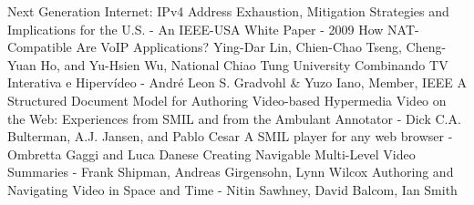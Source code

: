 \documentclass[11pt,twocolumn]{article}
\begin{document}
\begin{thebibliography}{9}


 Next Generation Internet: IPv4 Address Exhaustion, Mitigation Strategies and Implications for the U.S. - An IEEE-USA White Paper - 2009
 How NAT-Compatible Are VoIP Applications? Ying-Dar Lin, Chien-Chao Tseng, Cheng-Yuan Ho, and Yu-Hsien Wu, National Chiao Tung University
 Combinando TV Interativa e Hipervídeo - André Leon S. Gradvohl \& Yuzo Iano, Member, IEEE
 A Structured Document Model for Authoring Video-based Hypermedia
 Video on the Web: Experiences from SMIL and from the Ambulant Annotator - Dick C.A. Bulterman, A.J. Jansen, and Pablo Cesar
 A SMIL player for any web browser - Ombretta Gaggi and Luca Danese
 Creating Navigable Multi-Level Video Summaries - Frank Shipman, Andreas Girgensohn, Lynn Wilcox
 Authoring and Navigating Video in Space and Time - Nitin Sawhney, David Balcom, Ian Smith
\end{thebibliography}
\end{document}
